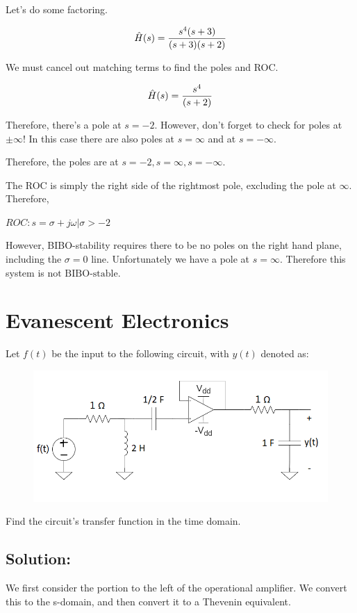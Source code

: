 \documentclass{article}
\begin{document}
Let's do some factoring.

$$\Hat{H}(s) = \frac{s^4(s+3)}{(s+3)(s+2)}$$

We must cancel out matching terms to find the poles and ROC.

$$\Hat{H}(s) = \frac{s^4}{(s+2)}$$

Therefore, there's a pole at $s = -2$. However, don't forget to check for poles at $\pm \infty$! In this case there are also poles at $s = \infty$ and at $s = -\infty$.

Therefore, the poles are at $\boxed{s = -2, s = \infty, s = -\infty}$.

The ROC is simply the right side of the rightmost pole, excluding the pole at $\infty$. Therefore,

$\boxed{ROC: s = \sigma + j \omega \vert \sigma > -2}$

However, BIBO-stability requires there to be no poles on the right hand plane, including the $\sigma = 0$ line. Unfortunately we have a pole at $s = \infty$. Therefore this system is $\boxed{\text{not BIBO-stable}}$.

\vspace{4cm}

\section{Evanescent Electronics}

Let $f(t)$ be the input to the following circuit, with $y(t)$ denoted as:

\begin{figure}[h]
\begin{center}
    \includegraphics[width=0.5 
    \textwidth]{figures/circuit7.png}
\end{center}
\end{figure}

Find the circuit's transfer function in the time domain.

\subsection{Solution:}

We first consider the portion to the left of the operational amplifier. We convert this to the s-domain, and then convert it to a Thevenin equivalent.
\end{document}
